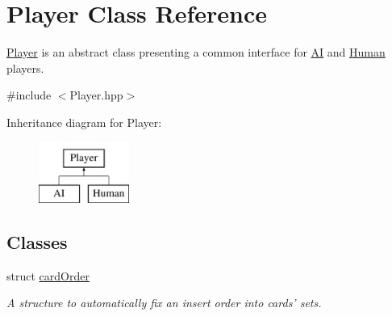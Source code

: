 \hypertarget{classPlayer}{\section{\-Player \-Class \-Reference}
\label{classPlayer}
}


\hyperlink{classPlayer}{\-Player} is an abstract class presenting a common interface for \hyperlink{classAI}{\-A\-I} and \hyperlink{classHuman}{\-Human} players.  




{\ttfamily \#include $<$\-Player.\-hpp$>$}

\-Inheritance diagram for \-Player\-:\begin{figure}[H]
\begin{center}
\leavevmode
\includegraphics[height=2.000000cm]{classPlayer}
\end{center}
\end{figure}
\subsection*{\-Classes}
\begin{DoxyCompactItemize}
\item 
struct \hyperlink{structPlayer_1_1cardOrder}{card\-Order}
\begin{DoxyCompactList}\small\item\em \-A structure to automatically fix an insert order into cards' sets. \end{DoxyCompactList}\end{DoxyCompactItemize}
